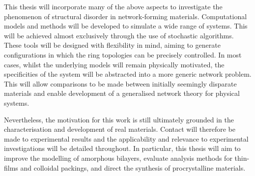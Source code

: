 This thesis will incorporate many of the above aspects to investigate the phenomenon of structural disorder in \td{} network\--forming materials.
Computational models and methods will be developed to simulate a wide range of \td{} systems.
This will be achieved almost exclusively through the use of stochastic \mc{} algorithms.
These tools will be designed with flexibility in mind, aiming to generate configurations in which the ring topologies can be precisely controlled.
In most cases, whilst the underlying models will remain physically motivated, the specificities of the system will be abstracted into a more generic network problem.
This will allow comparisons to be made between initially seemingly disparate materials and enable development of a generalised network theory for physical \td{} systems.

Nevertheless, the motivation for this work is still ultimately grounded in the characterisation and development of real materials.
Contact will therefore be made to experimental results and the applicability and relevance to experimental investigations will be detailed throughout.
In particular, this thesis will aim to improve the modelling of amorphous bilayers, evaluate analysis methods for thin\--films and colloidal packings, and direct the synthesis of procrystalline materials.  

